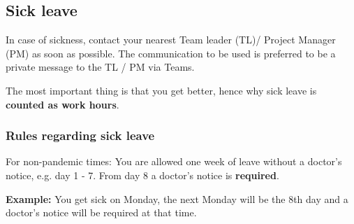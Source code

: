 \subsection*{Sick leave}
    In case of sickness, contact your nearest Team leader (TL)/ Project Manager (PM) as soon as possible. The communication to be used is preferred to be a private message to the TL / PM via Teams.
     
    The most important thing is that you get better, hence why sick leave is \textbf{counted as work hours}.

\subsubsection*{Rules regarding sick leave}
    
    For non-pandemic times: You are allowed one week of leave without a doctor's notice, e.g. day 1 - 7. From day 8 a doctor's notice is \textbf{required}.
    
    \textbf{Example:} You get sick on Monday, the next Monday will be the 8th day and a doctor's notice will be required at that time.